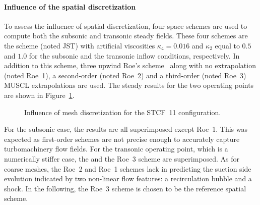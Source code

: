 \paragraph{Influence of the spatial discretization}
To assess the influence of spatial discretization, four space schemes are
used to compute both the subsonic and transonic steady fields. These
four schemes are the \citet{Jameson1981} scheme (noted JST) with artificial
viscosities $\kappa_4 = 0.016$
and $\kappa_2$ equal to $0.5$ and $1.0$ for the subsonic and the transonic
inflow conditions, respectively. In addition to this scheme, three upwind
Roe's scheme~\cite{Roe1981} along with no extrapolation (noted Roe~1),
a second-order (noted Roe~2) and a third-order (noted Roe~3) 
MUSCL extrapolations are used.
The steady results for the two operating points are shown 
in Figure~\ref{fig:stcf11_space_scheme_convergence}.
\begin{figure}[htp]
  \centering
  \caption{Influence of mesh discretization for the STCF~11 configuration.}
  \label{fig:stcf11_space_scheme_convergence}
\end{figure}
For the subsonic case, the results are all superimposed except Roe~1. 
This was expected as first-order schemes
are not precise enough to accurately capture turbomachinery flow fields.
For the transonic operating point, which is a numerically stiffer case,
the \citet{Jameson1981} and the Roe~3 scheme are superimposed.
As for coarse meshes, the Roe~2 and Roe~1 schemes
lack in predicting the suction side evolution indicated
by two non-linear flow features: a recirculation
bubble and a shock. In the following,
the Roe~3 scheme is chosen to be the reference spatial scheme.
